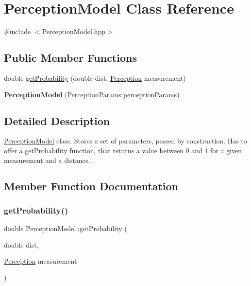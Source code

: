 \hypertarget{classPerceptionModel}{}\section{Perception\+Model Class Reference}
\label{classPerceptionModel}


{\ttfamily \#include $<$Perception\+Model.\+hpp$>$}

\subsection*{Public Member Functions}
\begin{DoxyCompactItemize}
\item 
double \hyperlink{classPerceptionModel_afc775e9a90453018b5dc8935101eb8c9}{get\+Probability} (double dist, \hyperlink{structPerception}{Perception} measurement)
\item 
\mbox{\label{classPerceptionModel_ad849ede6bd8200ad34370f6c33fbfaaf}} 
{\bfseries Perception\+Model} (\hyperlink{structPerceptionParams}{Perception\+Params} perception\+Params)
\end{DoxyCompactItemize}


\subsection{Detailed Description}
\hyperlink{classPerceptionModel}{Perception\+Model} class. Stores a set of parameters, passed by construction. Has to offer a get\+Probability function, that returns a value between 0 and 1 for a given measurement and a distance. 

\subsection{Member Function Documentation}
\mbox{\label{classPerceptionModel_afc775e9a90453018b5dc8935101eb8c9}} 
\subsubsection{\texorpdfstring{get\+Probability()}{getProbability()}}
{\footnotesize\ttfamily double Perception\+Model\+::get\+Probability (\begin{DoxyParamCaption}\item[{double}]{dist,  }\item[{\hyperlink{structPerception}{Perception}}]{measurement }\end{DoxyParamCaption})}



